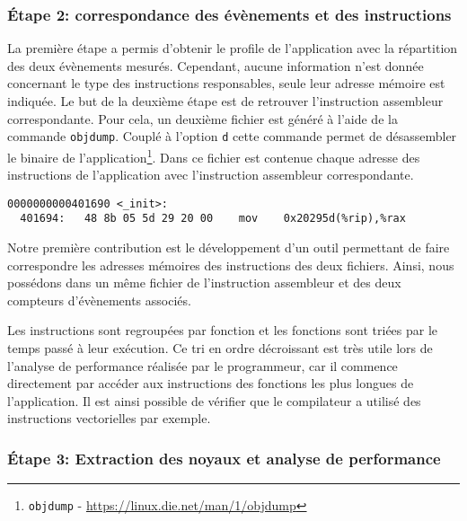   
        
    \subsubsection{Étape 2: correspondance des évènements et des instructions}

    La première étape a permis d'obtenir le profile de l'application avec la répartition des deux évènements mesurés. Cependant, aucune information n'est donnée concernant le type des instructions responsables, seule leur adresse mémoire est indiquée. Le but de la deuxième étape est de retrouver l'instruction assembleur correspondante. Pour cela, un deuxième fichier est généré à l'aide de la commande \verb=objdump=. Couplé à l'option \verb=d= cette commande permet de désassembler le binaire de l'application\footnote{\verb=objdump= - \url{https://linux.die.net/man/1/objdump}}. Dans ce fichier est contenue chaque adresse des instructions de l'application avec l'instruction assembleur correspondante.

\begin{lstlisting}[label=lst:dev_op_obj_out, caption=La commande objdump permet de désassembler le fichier binaire de l'application.]
0000000000401690 <_init>:
  401694:	48 8b 05 5d 29 20 00 	mov    0x20295d(%rip),%rax
\end{lstlisting}  

        Notre première contribution est le développement d'un outil permettant de faire correspondre les adresses mémoires des instructions des deux fichiers. Ainsi, nous possédons dans un même fichier de l'instruction assembleur et des deux compteurs d'évènements associés. 
        

        Les instructions sont regroupées par fonction et les fonctions sont triées par le temps passé à leur exécution. Ce tri en ordre décroissant est très utile lors de l'analyse de performance réalisée par le programmeur, car il commence directement par accéder aux instructions des fonctions les plus longues de l'application. Il est ainsi possible de vérifier que le compilateur a utilisé des instructions vectorielles par exemple. 


    \subsubsection{Étape 3: Extraction des noyaux et analyse de performance}
    
